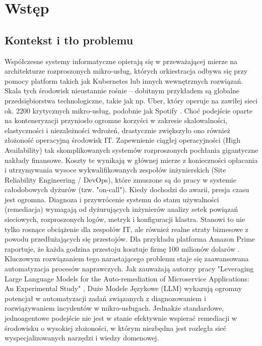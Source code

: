 \chapter{Wstęp}
\section{Kontekst i tło problemu}
Współczesne systemy informatyczne opierają się w przeważającej mierze na architekturze rozproszonych mikro-usług, których orkiestracja odbywa się przy pomocy platform takich jak Kubernetes lub innych wewnętrznych rozwiązań. Skala tych środowisk nieustannie rośnie – dobitnym przykładem są globalne przedsiębiorstwa technologiczne, takie jak np. Uber, który operuje na zawiłej sieci ok. 2200 krytycznych mikro-usług\cite{uber_microservices}, podobnie jak Spotify \cite{spotify_microservices}. Choć podejście oparte na konteneryzacji przyniosło ogromne korzyści w zakresie skalowalności, elastyczności i niezależności wdrożeń, drastycznie zwiększyło ono również złożoność operacyjną środowisk IT. Zapewnienie ciągłej operacyjności (High Availability) tak skomplikowanych systemów rozproszonych pochłania gigantyczne nakłady finansowe. Koszty te wynikają w głównej mierze z konieczności opłacania i utrzymywania wysoce wykwalifikowanych zespołów inżynierskich (Site Reliability Engineering / DevOps), które zmuszone są do pracy w systemie całodobowych dyżurów (tzw. "on-call"). Kiedy dochodzi do awarii, presja czasu jest ogromna. Diagnoza i przywrócenie systemu do stanu używalności (remediacja) wymagają od dyżurujących inżynierów analizy setek powiązań sieciowych, rozproszonych logów, metryk i konfiguracji klastra. Stanowi to nie tylko rosnące obciążenie dla zespołów IT, ale również realne straty biznesowe z powodu przedłużających się przestojów. Dla przykładu platforma Amazon Prime raportuje, że każda godzina przestoju kosztuje firmę 100 milionów dolarów \cite{amazon_prime_down_cost}. Kluczowym rozwiązaniem tego narastającego problemu staje się zaawansowana automatyzacja procesów naprawczych. Jak zauważają autorzy pracy "Leveraging Large Language Models for the Auto-remediation of Microservice Applications: An Experimental Study" \cite{sarda2024leveraging}, Duże Modele Językowe (LLM) wykazują ogromny potencjał w automatyzacji zadań związanych z diagnozowaniem i rozwiązywaniem incydentów w mikro-usługach. Jednakże standardowe, jednoagentowe podejście nie jest w stanie efektywnie wspierać remediacji w środowisku o wysokiej złożoności, w którym niezbędna jest rozległa sieć wyspecjalizowanych narzędzi i wiedzy domenowej.
